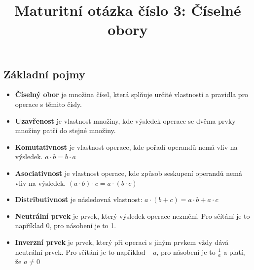 \documentclass[12pt]{article}
\title{Maturitní otázka číslo 3: Číselné obory}
\author{}
\date{}
\begin{document}
\maketitle
\subsection*{Základní pojmy}
\begin{itemize}[itemsep = 2pt]
    \item \textbf{Číselný obor} je množina čísel, která splňuje určité vlastnosti a pravidla pro operace s těmito čísly.
    \item \textbf{Uzavřenost} je vlastnost množiny, kde výsledek operace se dvěma prvky množiny patří do stejné množiny.
    \item \textbf{Komutativnost} je vlastnost operace, kde pořadí operandů nemá vliv na výsledek. $a \cdot b = b \cdot a$
    \item \textbf{Asociativnost} je vlastnost operace, kde způsob seskupení operandů nemá vliv na výsledek. $(a \cdot b) \cdot c = a \cdot (b \cdot c)$
    \item \textbf{Distributivnost} je následovná vlastnost: $a \cdot (b + c) = a \cdot b + a \cdot c$
    \item \textbf{Neutrální prvek} je prvek, který výsledek operace nezmění. Pro sčítání je to například 0, pro násobení je to 1.
    \item \textbf{Inverzní prvek} je prvek, který při operaci s jiným prvkem vždy dává neutrální prvek. Pro sčítání je to například $-a$, pro násobení je to $\frac{1}{a}$ a platí, že $a \neq 0$
\end{itemize}
\end{document}
